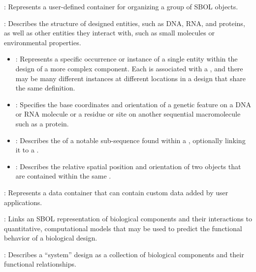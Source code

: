 \begin{description}

\item \emph{}:
Represents a user-defined container for organizing a group of SBOL objects.

\item \emph{}: Describes the structure of designed entities, such as DNA, RNA, and proteins, as well as other entities they interact with, such as small molecules or environmental properties.

\begin{itemize}
\item \emph{}:
Represents a specific occurrence or instance of a single entity within the design of a more complex component.
Each  is associated with a , and there may be many different instances at different locations in a design that share the same definition.

\item \emph{}:
Specifies the base coordinates and orientation of a genetic feature on a DNA or RNA molecule or a residue or site on another sequential macromolecule such as a protein.

\item \emph{}:
Describes the  of a notable sub-sequence found within a , optionally linking it to a .

\item \emph{}:
Describes the relative spatial position and orientation of two  objects that are contained within the same .
\end{itemize}

\item \emph{}:
Represents a data container that can contain custom data added by user applications.

\item \emph{}:
Links an SBOL representation of biological components and their interactions to quantitative, computational models that may be used to predict the functional behavior of a biological design.

\item \emph{}:
Describes a ``system'' design as a collection of biological components and their functional relationships.


\end{description}
